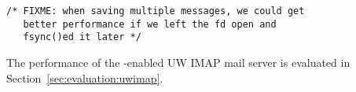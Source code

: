 \vspace{-0.5\baselineskip}
\begin{scriptsize}
\begin{verbatim}
/* FIXME: when saving multiple messages, we could get
   better performance if we left the fd open and
   fsync()ed it later */
\end{verbatim}
\end{scriptsize}
\vspace{-0.5\baselineskip}

The performance of the \patchgroup{}-enabled UW IMAP mail server is
evaluated in Section~\ref{sec:evaluation:uwimap}.
